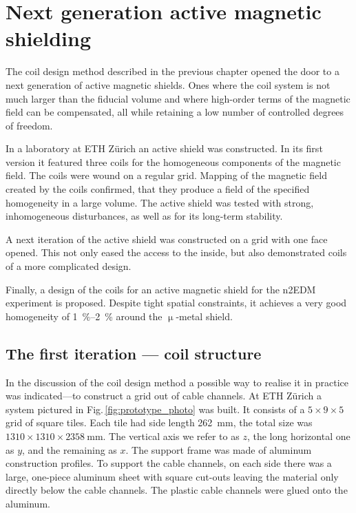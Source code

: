 \chapter{Next generation active magnetic shielding}
\label{ch:sfc-prototype}

The coil design method described in the previous chapter opened the door to a next generation of active magnetic shields. Ones where the coil system is not much larger than the fiducial volume and where high-order terms of the magnetic field can be compensated, all while retaining a low number of controlled degrees of freedom.

In a laboratory at ETH Zürich an active shield was constructed. In its first version it featured three coils for the homogeneous components of the magnetic field. The coils were wound on a regular grid. Mapping of the magnetic field created by the coils confirmed, that they produce a field of the specified homogeneity in a large volume. The active shield was tested with strong, inhomogeneous disturbances, as well as for its long-term stability.

A next iteration of the active shield was constructed on a grid with one face opened. This not only eased the access to the inside, but also demonstrated coils of a more complicated design.

Finally, a design of the coils for an active magnetic shield for the n2EDM experiment is proposed. Despite tight spatial constraints, it achieves a very good homogeneity of \SIrange[range-phrase=--,range-units=single]{1}{2}{\percent} around the $\upmu$-metal shield.




\section{The first iteration --- coil structure}
In the discussion of the coil design method a possible way to realise it in practice was indicated---to construct a grid out of cable channels. At ETH Zürich a system pictured in Fig.\,\ref{fig:prototype_photo} was built. It consists of a $5 \times 9 \times 5$ grid of square tiles. Each tile had side length \SI{262}{\milli\meter}, the total size was $1310 \times 1310 \times \SI{2358}{\milli\meter}$. The vertical axis we refer to as $z$, the long horizontal one as $y$, and the remaining as $x$. The support frame was made of aluminum construction profiles. To support the cable channels, on each side there was a large, one-piece aluminum sheet with square cut-outs leaving the material only directly below the cable channels. The plastic cable channels were glued onto the aluminum.

